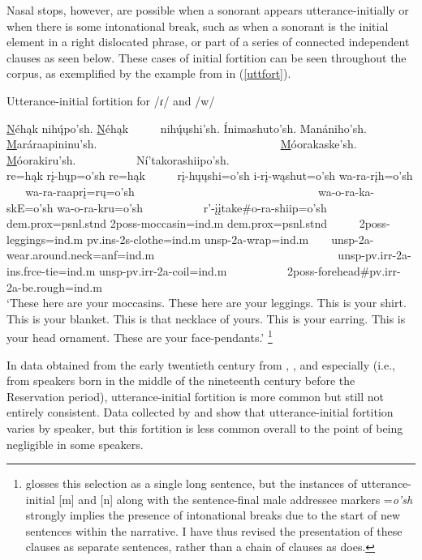 Nasal stops, however, are possible when a sonorant appears utterance-initially or when there is some intonational break, such as when a sonorant is the initial element in a right dislocated phrase, or part of a series of connected independent clauses as seen below. These cases of initial fortition can be seen throughout the corpus, as exemplified by the example from \citet{lowie1913} in (\ref{uttfort}).

\begin{exe}
\item\label{uttfort} Utterance-initial fortition for /ɾ/ and /w/

	\glll \uline{N}éhąk nihų́po'sh. \uline{N}éhąk ~ ~ ~ nihų́ųshi'sh. Ínimashuto'sh. Manániho'sh.  ~ ~ \uline{M}aráraapininu'sh. ~ ~ ~ ~ ~ ~ ~ ~ ~ ~ ~ ~ ~ ~ ~ ~ ~ ~ ~ \uline{M}óorakaske'sh. \uline{M}óorakiru'sh. ~ ~ ~ ~ ~ ~ Ní'takorashiipo'sh.\\
	re=hąk rį-hųp=o'sh re=hąk ~ ~ ~ rį-hųųshi=o'sh i-rį-wąshut=o'sh wa-ra-rįh=o'sh ~ ~ wa-ra-raaprį=rų=o'sh ~ ~ ~ ~ ~ ~ ~ ~ ~ ~ ~ ~ ~ ~ ~ ~ ~ ~ ~ wa-o-ra-ka-skE=o'sh wa-o-ra-kru=o'sh ~ ~ ~ ~ ~ ~ r'-įįtake\#o-ra-shiip=o'sh\\
	dem.prox=psnl.stnd 2poss-\textnormal{moccasin}=ind.m dem.prox=psnl.stnd ~ ~ ~ 2poss-\textnormal{leggings}=ind.m pv.ins-2s-\textnormal{clothe}=ind.m unsp-2a-\textnormal{wrap}=ind.m ~ ~ unsp-2a-\textnormal{wear.around.neck}=anf=ind.m ~ ~ ~ ~ ~ ~ ~ ~ ~ ~ ~ ~ ~ ~ ~ ~ ~ ~ ~ unsp-pv.irr-2a-ins.frce-\textnormal{tie}=ind.m unsp-pv.irr-2a-\textnormal{coil}=ind.m ~ ~ ~ ~ ~ ~ 2poss-\textnormal{forehead}\#pv.irr-2a-\textnormal{be.rough}=ind.m\\
	\glt	`These here are your moccasins. These here are your leggings. This is your shirt. This is your blanket. This is that necklace of yours. This is your earring. This is your head ornament. These are your face-pendants.' \citep[358]{lowie1913}\footnote{\citet{lowie1913} glosses this selection as a single long sentence, but the instances of utterance-initial [m] and [n] along with the sentence-final male addressee markers =\textit{o'sh} strongly implies the presence of intonational breaks due to the start of new sentences within the narrative. I have thus revised the presentation of these clauses as separate sentences, rather than a chain of clauses as \citeauthor{lowie1913} does.}

\end{exe}

In data obtained from the early twentieth century from \citet{kennard1936}, \citet{densmore1923}, and especially \citet{lowie1913} (i.e., from speakers born in the middle of the nineteenth century before the Reservation period), utterance-initial fortition is more common but still not entirely consistent. Data collected by \citet{hollow1970} and \citet{trechter2012} show that utterance-initial fortition varies by speaker, but this fortition is less common overall to the point of being negligible in some speakers.

